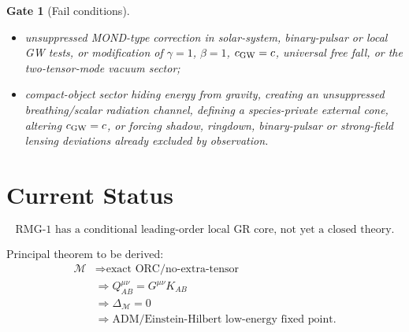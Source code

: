 \documentclass[11pt]{article}
\newtheorem{gate}{Gate}
\begin{document}
\begin{gate}[Fail conditions]
\begin{itemize}
  tensor flux not balanced by \(dE_{\rm orbit}/dt=-P_{TT}\), missing angular
  momentum flux for eccentric timing systems, or a chirp mass not built from
  the Root~C total-energy masses \(m_A=E_A/c^2\);
\item unsuppressed MOND-type correction in solar-system, binary-pulsar or
  local GW tests, or modification of $\gamma=1$, $\beta=1$, $c_{\rm GW}=c$,
  universal free fall, or the two-tensor-mode vacuum sector;
\item compact-object sector hiding energy from gravity, creating an
  unsuppressed breathing/scalar radiation channel, defining a species-private
  external cone, altering $c_{\rm GW}=c$, or forcing shadow, ringdown,
  binary-pulsar or strong-field lensing deviations already excluded by
  observation.
\end{itemize}
\end{gate}

\section*{Current Status}

\[
\boxed{
\text{RMG-1 has a conditional leading-order local GR core, not yet a closed theory.}
}
\]

Principal theorem to be derived:
\[
\boxed{
\begin{aligned}
\mathcal M
&\Rightarrow \text{exact ORC/no-extra-tensor}\\
&\Rightarrow Q_{AB}^{\mu\nu}=G^{\mu\nu}K_{AB}\\
&\Rightarrow \Delta_{\mathcal M}=0\\
&\Rightarrow \text{ADM/Einstein-Hilbert low-energy fixed point}.
\end{aligned}
}
\]
\end{document}
